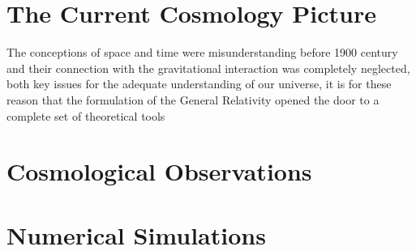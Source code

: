 \section{The Current Cosmology Picture}
\label{sec:TheCurrentCosmologyPicture}


The conceptions of space and time were misunderstanding before 1900 century
and their connection with the gravitational interaction was completely 
neglected, both key issues for the adequate understanding of our universe,
it is for these reason that the formulation of the General Relativity opened
the door to a complete set of theoretical tools






\section{Cosmological Observations}
\label{sec:CosmologicalObservations}
	




\section{Numerical Simulations}
\label{sec:NumericalSimulations}


